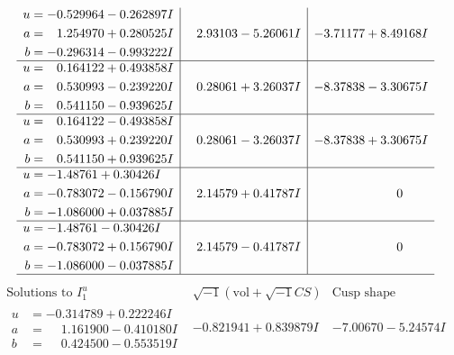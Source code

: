 \documentclass[1p]{elsarticle_modified}
\theoremstyle{definition}
\newcommand{\I}{\sqrt{-1}}
\begin{document}
$$\begin{array}{c|c|c}
\begin{aligned}
u &= -0.529964 - 0.262897 I \\
a &= \phantom{-}1.254970 + 0.280525 I \\
b &= -0.296314 - 0.993222 I\end{aligned}
 & \phantom{-}2.93103 - 5.26061 I & -3.71177 + 8.49168 I \\ \hline\begin{aligned}
u &= \phantom{-}0.164122 + 0.493858 I \\
a &= \phantom{-}0.530993 - 0.239220 I \\
b &= \phantom{-}0.541150 - 0.939625 I\end{aligned}
 & \phantom{-}0.28061 + 3.26037 I & -8.37838 - 3.30675 I \\ \hline\begin{aligned}
u &= \phantom{-}0.164122 - 0.493858 I \\
a &= \phantom{-}0.530993 + 0.239220 I \\
b &= \phantom{-}0.541150 + 0.939625 I\end{aligned}
 & \phantom{-}0.28061 - 3.26037 I & -8.37838 + 3.30675 I \\ \hline\begin{aligned}
u &= -1.48761 + 0.30426 I \\
a &= -0.783072 - 0.156790 I \\
b &= -1.086000 + 0.037885 I\end{aligned}
 & \phantom{-}2.14579 + 0.41787 I & \phantom{-0.000000 } 0 \\ \hline\begin{aligned}
u &= -1.48761 - 0.30426 I \\
a &= -0.783072 + 0.156790 I \\
b &= -1.086000 - 0.037885 I\end{aligned}
 & \phantom{-}2.14579 - 0.41787 I & \phantom{-0.000000 } 0\\
 \hline 
 \end{array}$$\newpage$$\begin{array}{c|c|c}  
\text{Solutions to }I^u_{1}& \I (\text{vol} + \sqrt{-1}CS) & \text{Cusp shape}\\
 \hline 
\begin{aligned}
u &= -0.314789 + 0.222246 I \\
a &= \phantom{-}1.161900 - 0.410180 I \\
b &= \phantom{-}0.424500 - 0.553519 I\end{aligned}
 & -0.821941 + 0.839879 I & -7.00670 - 5.24574 I \\ \hline\begin{aligned}

\end{aligned}
\end{array}$$
\end{document}
